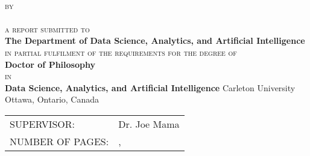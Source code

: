 \begin{titlepage}
  \thispagestyle{empty}
  \centering
  \vspace*{\fill}
  {\LARGE \textbf{\expandafter{\reporttitleI}}}\\[2mm]
  {\LARGE \textbf{\expandafter{\reporttitleII}}}
  \vfill
  {\scshape by}\\
  {\large \expandafter{\myname}}\\
  \vfill
  {\scshape a report submitted to}\\
  \textbf{The Department of Data Science, Analytics, and Artificial Intelligence}\\
  {\scshape in partial fulfilment of the requirements for the degree of}\\
  \textbf{Doctor of Philosophy}\\
  {\scshape in}\\
  \textbf{Data Science, Analytics, and Artificial Intelligence}
  \vfill
  {\large Carleton University}\\
  {\large Ottawa, Ontario, Canada}
  \vfill
  {\large \textcopyright{} \the\year{}}\\
  {\large \expandafter{\myname}}
\end{titlepage}

\clearpage

\setcounter{page}{2}
\noindent

\vspace*{\fill}

\begin{tabular}{l l}
  SUPERVISOR:      &Dr. Joe Mama\\[5mm]
  NUMBER OF PAGES: &\pageref*{endfrontmatter}, \pageref*{LastPage}
\end{tabular}

\vfill

\clearpage

\tableofcontents

\listoffigures

\listoftables

\listofalgorithms

\label{endfrontmatter} %
